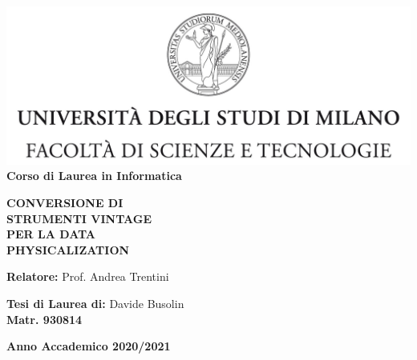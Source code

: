 \documentclass[12pt,a4paper]{report}
\begin{document}
\begin{titlepage}
  \begin{center}
    \includegraphics[width=\textwidth]{Logo.jpg}\\
    {\large{\bf Corso di Laurea in Informatica}}
  \end{center}
  \vspace{12mm}
  \begin{center}
    {\huge{\bf CONVERSIONE DI}}\\
    \vspace{4mm}
    {\huge{\bf STRUMENTI VINTAGE}}\\
    \vspace{4mm}
    {\huge{\bf PER LA DATA}}\\
    \vspace{4mm}
    {\huge{\bf PHYSICALIZATION}}\\
  \end{center}
  \vspace{12mm}
  \begin{flushleft}
    {\large{\bf Relatore:}}
    {\large{Prof. Andrea Trentini}}\\
  \end{flushleft}
  \vspace{12mm}
  \begin{flushright}
    {\large{\bf Tesi di Laurea di:}}
    {\large{Davide Busolin}}\\
    {\large{\bf Matr. 930814}}\\
  \end{flushright}
  \vspace{4mm}
  \begin{center}
    {\large{\bf Anno Accademico 2020/2021}}
  \end{center}
\end{titlepage}

\listoftodos
\tableofcontents
\end{document}
